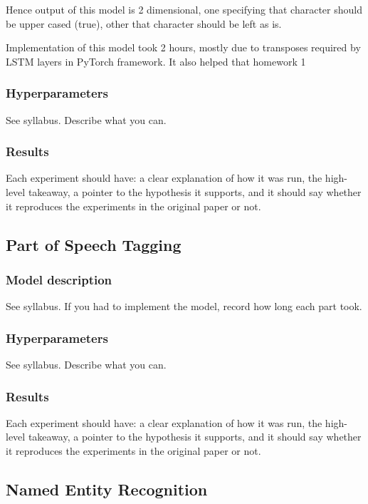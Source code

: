 \documentclass[11pt,a4paper]{article}
\begin{document}
    Hence output of this model is 2 dimensional, one specifying that character should be upper cased (true), other that character should be left as is.

    Implementation of this model took 2 hours, mostly due to transposes required by LSTM layers in PyTorch framework. It also helped that homework 1

    \subsubsection{Hyperparameters}
    See syllabus. Describe what you can.

    \subsubsection{Results}
    Each experiment should have: a clear explanation of how it was run, the high-level takeaway, a pointer to the hypothesis it supports, and it should say whether it reproduces the experiments in the original paper or not.

\subsection{Part of Speech Tagging}
\label{sec:exp-pos}

    \subsubsection{Model description}
    See syllabus. If you had to implement the model, record how long each part took.

    \subsubsection{Hyperparameters}
    See syllabus. Describe what you can.

    \subsubsection{Results}
    Each experiment should have: a clear explanation of how it was run, the high-level takeaway, a pointer to the hypothesis it supports, and it should say whether it reproduces the experiments in the original paper or not.

\subsection{Named Entity Recognition}
\label{sec:exp-ner}
\end{document}
